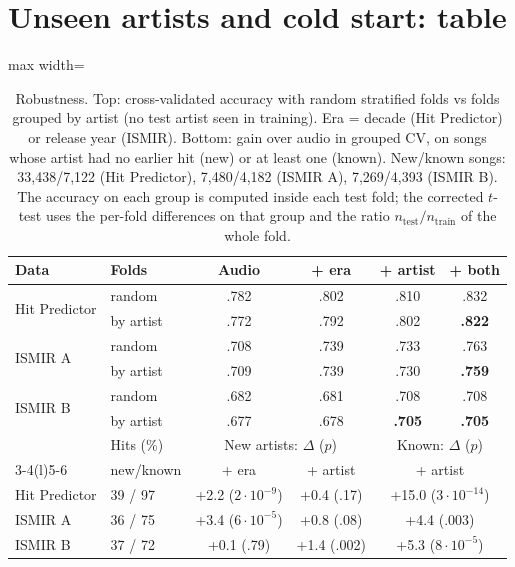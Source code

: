 \section{Unseen artists and cold start: table}\label{app:robust}
\begin{table}[!htbp]
\centering
\caption{Robustness. Top: cross-validated accuracy with random stratified folds vs folds
grouped by artist (no test artist seen in training). Era = decade (Hit Predictor) or
release year (ISMIR). Bottom: gain over audio in grouped CV, on songs whose artist had no
earlier hit (new) or at least one (known). New/known songs: 33{,}438/7{,}122 (Hit
Predictor), 7{,}480/4{,}182 (ISMIR A), 7{,}269/4{,}393 (ISMIR B). The accuracy on each group is computed inside
each test fold; the corrected $t$-test uses the per-fold differences on that group and the ratio
$n_{\text{test}}/n_{\text{train}}$ of the whole fold.}
\label{tab:robust}
\footnotesize
\setlength{\tabcolsep}{2.6pt}
\begin{adjustbox}{max width=\columnwidth}
\begin{tabular}{@{}llcccc@{}}
\toprule
Data & Folds & Audio & + era & + artist & + both \\
\midrule
\multirow{2}{*}{Hit Predictor} & random & .782 & .802 & .810 & .832 \\
 & by artist & .772 & .792 & .802 & \textbf{.822} \\
\multirow{2}{*}{ISMIR A} & random & .708 & .739 & .733 & .763 \\
 & by artist & .709 & .739 & .730 & \textbf{.759} \\
\multirow{2}{*}{ISMIR B} & random & .682 & .681 & .708 & .708 \\
 & by artist & .677 & .678 & \textbf{.705} & \textbf{.705} \\
\midrule
& Hits (\%) & \multicolumn{2}{c}{New artists: $\Delta$ ($p$)} & \multicolumn{2}{c}{Known: $\Delta$ ($p$)} \\
\cmidrule(lr){3-4}\cmidrule(l){5-6}
& new/known & + era & + artist & \multicolumn{2}{c}{+ artist} \\
\midrule
Hit Predictor & 39 / 97 & +2.2 ($2{\cdot}10^{-9}$) & +0.4 (.17) & \multicolumn{2}{c}{+15.0 ($3{\cdot}10^{-14}$)} \\
ISMIR A & 36 / 75 & +3.4 ($6{\cdot}10^{-5}$) & +0.8 (.08) & \multicolumn{2}{c}{+4.4 (.003)} \\
ISMIR B & 37 / 72 & +0.1 (.79) & +1.4 (.002) & \multicolumn{2}{c}{+5.3 ($8{\cdot}10^{-5}$)} \\
\bottomrule
\end{tabular}
\end{adjustbox}
\end{table}


